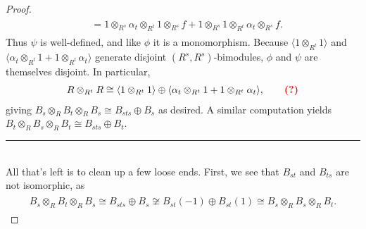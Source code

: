 \begin{proof}
\begin{align*}
\begin{split}
&= 1 \otimes_{R^s} \alpha_t \otimes_{R^t} 1 \otimes_{R^s} f + 1 \otimes_{R^s} 1 \otimes_{R^t} \alpha_t \otimes_{R^s} f.
\end{split}
\end{align*}
\noindent Thus $\psi$ is well-defined, and like $\phi$ it is a monomorphism. Because $\langle 1 \otimes_{R^t} 1\rangle$ and $\langle \alpha_t \otimes_{R^t} 1 + 1 \otimes_{R^t} \alpha_t\rangle$ generate disjoint $(R^s, R^s)$-bimodules, $\phi$ and $\psi$ are themselves disjoint. In particular,
\begin{align*}
R \otimes_{R^t} R \cong \langle 1 \otimes_{R^t} 1\rangle \oplus \langle \alpha_t \otimes_{R^t} 1 + 1 \otimes_{R^t} \alpha_t\rangle, \tag*{\textcolor{red}{\textbf{(?)}}}
\end{align*} %
\noindent giving $B_s \otimes_R B_t \otimes_R B_s \cong B_{sts} \oplus B_s$ as desired. A similar computation yields $B_t \otimes_R B_s \otimes_R B_t \cong B_{sts} \oplus B_t$.\\[-1.5\baselineskip]
\begin{center}
\rule{0.5\linewidth}{1pt}
\end{center}
\noindent\\[-\baselineskip] All that's left is to clean up a few loose ends. First, we see that $B_{st}$ and $B_{ts}$ are not isomorphic, as
\begin{align*}
\begin{split}
B_s \otimes_R B_t \otimes_R B_s \cong B_{sts} \oplus B_s \not\cong B_{st}(-1) \oplus B_{st}(1) \cong B_s \otimes_R B_s \otimes_R B_t.

\end{split}
\end{align*}
\end{proof}

